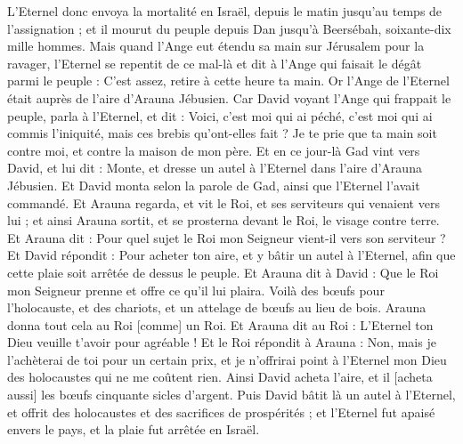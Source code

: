 \begin{multicols}{2}
L'Eternel donc envoya la mortalité en Israël, depuis le matin jusqu'au temps de l'assignation ; et il mourut du peuple depuis Dan jusqu'à Beersébah, soixante-dix mille hommes.
Mais quand l'Ange eut étendu sa main sur Jérusalem pour la ravager, l'Eternel se repentit de ce mal-là et dit à l'Ange qui faisait le dégât parmi le peuple : C'est assez, retire à cette heure ta main. Or l'Ange de l'Eternel était auprès de l'aire d'Arauna Jébusien.
Car David voyant l'Ange qui frappait le peuple, parla à l'Eternel, et dit : Voici, c'est moi qui ai péché, c'est moi qui ai commis l'iniquité, mais ces brebis qu'ont-elles fait ? Je te prie que ta main soit contre moi, et contre la maison de mon père.
Et en ce jour-là Gad vint vers David, et lui dit : Monte, et dresse un autel à l'Eternel dans l'aire d'Arauna Jébusien.
Et David monta selon la parole de Gad, ainsi que l'Eternel l'avait commandé.
Et Arauna regarda, et vit le Roi, et ses serviteurs qui venaient vers lui ; et ainsi Arauna sortit, et se prosterna devant le Roi, le visage contre terre.
Et Arauna dit : Pour quel sujet le Roi mon Seigneur vient-il vers son serviteur ? Et David répondit : Pour acheter ton aire, et y bâtir un autel à l'Eternel, afin que cette plaie soit arrêtée de dessus le peuple.
Et Arauna dit à David : Que le Roi mon Seigneur prenne et offre ce qu'il lui plaira. Voilà des bœufs pour l'holocauste, et des chariots, et un attelage de bœufs au lieu de bois.
Arauna donna tout cela au Roi [comme] un Roi. Et Arauna dit au Roi : L'Eternel ton Dieu veuille t'avoir pour agréable !
Et le Roi répondit à Arauna : Non, mais je l'achèterai de toi pour un certain prix, et je n'offrirai point à l'Eternel mon Dieu des holocaustes qui ne me coûtent rien. Ainsi David acheta l'aire, et il [acheta aussi] les bœufs cinquante sicles d'argent.
Puis David bâtit là un autel à l'Eternel, et offrit des holocaustes et des sacrifices de prospérités ; et l'Eternel fut apaisé envers le pays, et la plaie fut arrêtée en Israël.
\PPE{}
\end{multicols}
